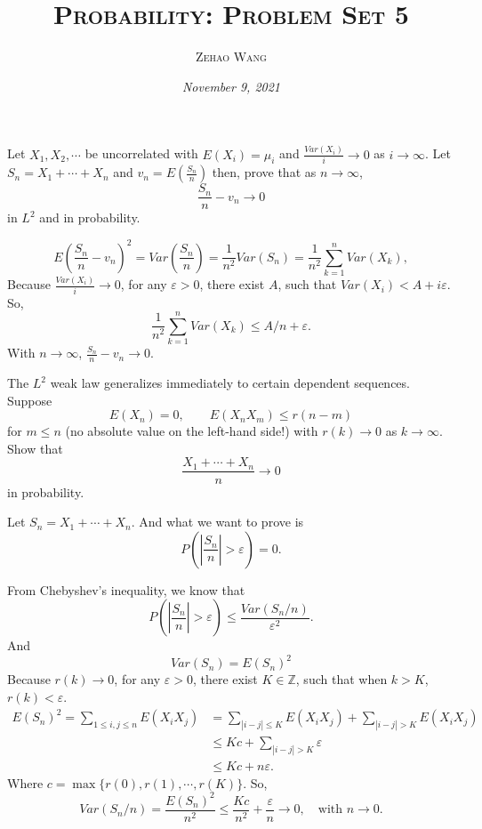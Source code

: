 \documentclass[en, normal, 11pt, black]{elegantnote}
\title{\textsc{Probability: Problem Set 5}}
\author{\textsc{Zehao Wang}}
\date{\emph{November 9, 2021}}
\newenvironment{exercise}[1]{\begin{tcolorbox}[colback=black!15, colframe=black!80, breakable, title=#1]}{\end{tcolorbox}}
\renewenvironment{proof}{\begin{tcolorbox}[colback=white, colframe=black!50, breakable, title=Proof. ]\setlength{\parskip}{0.8em}}{\,\\\rightline{$\square$}\end{tcolorbox}}
\begin{document}
    \maketitle
    \begin{exercise}{2.2.1}
        Let $X_{1}, X_{2}, \cdots$ be uncorrelated with $E (X_{i})=\mu_{i}$ and $\frac{Var\left(X_{i}\right) }{i} \rightarrow 0$ as $i \rightarrow \infty$. Let $S_{n}=X_{1}+\cdots+X_{n}$ and $v_{n}=E\left(\frac{S_n}{n}\right)$ then, prove that as $n \rightarrow \infty$, 
        \[
            \frac{S_{n}}{n}-v_{n} \rightarrow 0
        \]
        in $L^{2}$ and in probability. 
    \end{exercise}

    \begin{proof}
        \[
            E\left(\frac{S_n}{n}-v_n\right)^2=Var\left(\frac{S_n}{n}\right)=\frac{1}{n^2}Var(S_n)=\frac{1}{n^2}\sum_{k=1}^nVar(X_k), 
        \]
        Because $\frac{Var(X_i)}{i}\to0$, for any $\varepsilon>0$, there exist $A$, such that $Var(X_i)<A+i\varepsilon$. So, 
        \[
            \frac{1}{n^2}\sum_{k=1}^nVar(X_k)\leqslant A/n+\varepsilon. 
        \]
        With $n\to\infty$, $\frac{S_n}{n}-v_n\to0$. 
    \end{proof}

    \begin{exercise}{2.2.2}
        The $L^{2}$ weak law generalizes immediately to certain dependent sequences. Suppose 
        \[
            E (X_{n})=0, \qquad E (X_{n} X_{m}) \leqslant r(n-m)
        \]
        for $m \leqslant n$ (no absolute value on the left-hand side!) with $r(k) \rightarrow 0$ as $k \rightarrow \infty$. Show that 
        \[
            \frac{X_{1}+\cdots+X_{n}}{ n} \rightarrow 0
        \]
        in probability. 
    \end{exercise}

    \begin{proof}
        Let $S_n=X_1+\cdots+X_n$. And what we want to prove is 
        \[
            P\left(\left|\frac{S_n}{n}\right|>\varepsilon\right)=0. 
        \]

        From Chebyshev's inequality, we know that 
        \[
            P\left(\left|\frac{S_n}{n}\right|>\varepsilon\right)\leqslant\frac{Var(S_n/n)}{\varepsilon^2}. 
        \]
        And
        \[
            Var(S_n)=E(S_n)^2
        \]
        Because $r(k)\to0$, for any $\varepsilon>0$, there exist $K\in\mathbb{Z}$, such that when $k>K$, $r(k)<\varepsilon$. 
        \[
            \begin{aligned}
                E(S_n)^2=\sum_{1\leqslant i,j\leqslant n}E(X_iX_j)&=\sum_{|i-j|\leqslant K}E(X_iX_j)+\sum_{|i-j|>K}E(X_iX_j)\\
                &\leqslant Kc+\sum_{|i-j|>K}\varepsilon\\
                &\leqslant Kc+n\varepsilon. 
            \end{aligned}
        \]
        Where $c=\max\{r(0), r(1), \cdots, r(K)\}$. 
        So, 
        \[
            Var(S_n/n)=\frac{E(S_n)^2}{n^2}\leqslant\frac{Kc}{n^2}+\frac{\varepsilon}{n}\to0,\quad\text{with $n\to0$}. 
        \]
    \end{proof}
\end{document}
